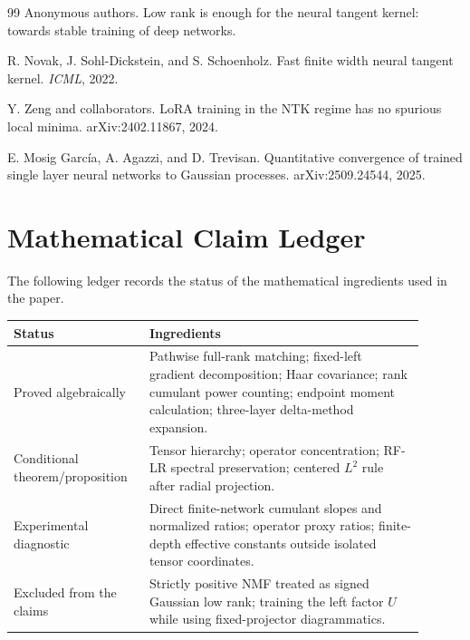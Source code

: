 \documentclass{article}
\begin{document}
\begin{thebibliography}{99}
Anonymous authors.
\newblock Low rank is enough for the neural tangent kernel: towards stable training of deep networks.

R. Novak, J. Sohl-Dickstein, and S. Schoenholz.
\newblock Fast finite width neural tangent kernel.
\newblock \emph{ICML}, 2022.

Y. Zeng and collaborators.
\newblock LoRA training in the NTK regime has no spurious local minima.
\newblock arXiv:2402.11867, 2024.

E. Mosig García, A. Agazzi, and D. Trevisan.
\newblock Quantitative convergence of trained single layer neural networks to Gaussian processes.
\newblock arXiv:2509.24544, 2025.
\end{thebibliography}

\appendix

\section{Mathematical Claim Ledger}
The following ledger records the status of the mathematical ingredients used in the paper.
\begin{center}
\begin{tabular}{p{0.28\linewidth}p{0.62\linewidth}}
\toprule
Status & Ingredients \\
\midrule
Proved algebraically & Pathwise full-rank matching; fixed-left gradient decomposition; Haar covariance; rank cumulant power counting; endpoint moment calculation; three-layer delta-method expansion. \\
Conditional theorem/proposition & Tensor hierarchy; operator concentration; RF-LR spectral preservation; centered \(L^2\) rule after radial projection. \\
Experimental diagnostic & Direct finite-network cumulant slopes and normalized ratios; operator proxy ratios; finite-depth effective constants outside isolated tensor coordinates. \\
Excluded from the claims & Strictly positive NMF treated as signed Gaussian low rank; training the left factor \(U\) while using fixed-projector diagrammatics. \\
\bottomrule
\end{tabular}
\end{center}
\end{document}
